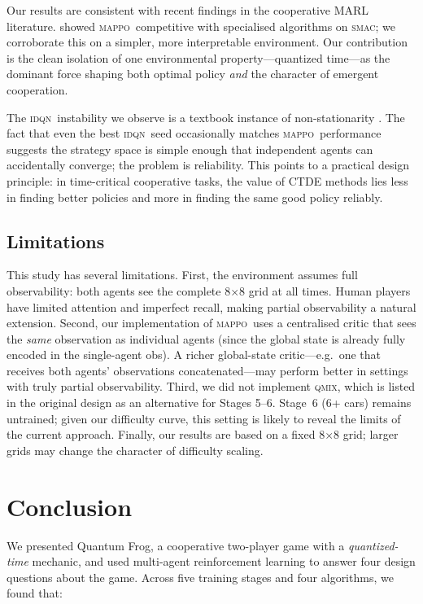 \documentclass[12pt]{article}
\newcommand{\MAPPO}{\textsc{mappo}}
\newcommand{\QMIX}{\textsc{qmix}}
\newcommand{\IDQN}{\textsc{idqn}}
\begin{document}
Our results are consistent with recent findings in the cooperative MARL
literature.  \citet{yu2022surprising} showed \MAPPO\ competitive with
specialised algorithms on \textsc{smac}; we corroborate this on a simpler,
more interpretable environment.  Our contribution is the clean isolation of
one environmental property—quantized time—as the dominant force shaping both
optimal policy \emph{and} the character of emergent cooperation.

The \IDQN\ instability we observe is a textbook instance of non-stationarity
\citep{hernandez2017survey}.  The fact that even the best \IDQN\ seed
occasionally matches \MAPPO\ performance suggests the strategy space is
simple enough that independent agents can accidentally converge; the problem
is reliability.  This points to a practical design principle: in time-critical
cooperative tasks, the value of CTDE methods lies less in finding better
policies and more in finding the same good policy reliably.

\subsection{Limitations}

This study has several limitations.  First, the environment assumes full
observability: both agents see the complete 8$\times$8 grid at all times.
Human players have limited attention and imperfect recall, making partial
observability a natural extension.  Second, our implementation of \MAPPO\
uses a centralised critic that sees the \emph{same} observation as individual
agents (since the global state is already fully encoded in the single-agent
obs).  A richer global-state critic—e.g.\ one that receives both agents'
observations concatenated—may perform better in settings with truly partial
observability.  Third, we did not implement \QMIX, which is listed in the
original design as an alternative for Stages 5--6.  Stage~6 (6+ cars) remains
untrained; given our difficulty curve, this setting is likely to reveal the
limits of the current approach.  Finally, our results are based on
a fixed 8$\times$8 grid; larger grids may change the character of difficulty
scaling.

\section{Conclusion}
\label{sec:conclusion}

We presented Quantum Frog, a cooperative two-player game with a
\emph{quantized-time} mechanic, and used multi-agent reinforcement learning
to answer four design questions about the game.  Across five training stages
and four algorithms, we found that:
\end{document}
